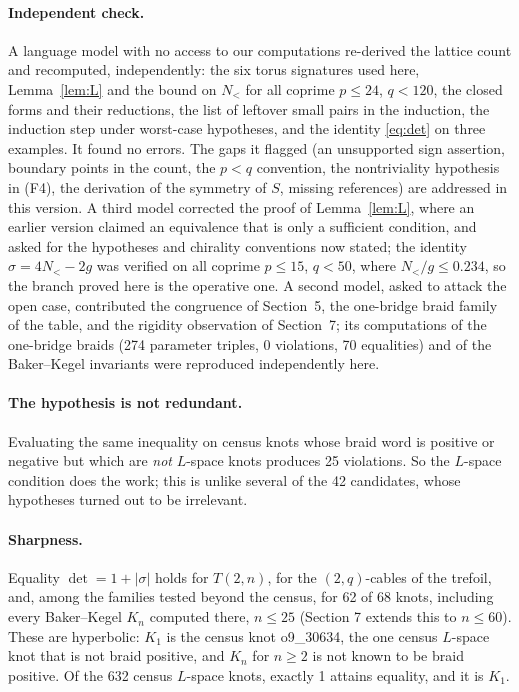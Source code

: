 \documentclass[11pt]{article}
\theoremstyle{definition}
\begin{document}
\paragraph{Independent check.} A language model with no access to our computations re-derived the lattice count and
recomputed, independently: the six torus signatures used here, Lemma~\ref{lem:L} and the bound on $N_<$ for all coprime
$p \le 24$, $q < 120$, the closed forms and their reductions, the list of leftover small pairs in the induction, the
induction step under worst-case hypotheses, and the identity \eqref{eq:det} on three examples. It found no errors. The
gaps it flagged (an unsupported sign assertion, boundary points in the count, the $p<q$ convention, the nontriviality
hypothesis in (F4), the derivation of the symmetry of $S$, missing references) are addressed in this version. A third model corrected the proof of Lemma~\ref{lem:L}, where an earlier version claimed an
equivalence that is only a sufficient condition, and asked for the hypotheses and chirality conventions now stated;
the identity $\sigma = 4N_{<} - 2g$ was verified on all coprime $p \le 15$, $q < 50$, where $N_{<}/g \le 0.234$, so
the branch proved here is the operative one. A second
model, asked to attack the open case, contributed the congruence of Section~5, the one-bridge braid family of the
table, and the rigidity observation of Section~7; its computations of the one-bridge braids (274 parameter triples, 0 violations,
70 equalities) and of the Baker--Kegel invariants were reproduced independently here.

\paragraph{The hypothesis is not redundant.} Evaluating the same inequality on census knots whose braid word is
positive or negative but which are \emph{not} $L$-space knots produces 25 violations. So the $L$-space condition does
the work; this is unlike several of the 42 candidates, whose hypotheses turned out to be irrelevant.

\paragraph{Sharpness.} Equality $\det = 1 + |\sigma|$ holds for $T(2,n)$, for the $(2,q)$-cables of the trefoil, and,
among the families tested beyond the census, for 62 of 68 knots, including every Baker--Kegel $K_n$ computed there,
$n \le 25$ (Section 7 extends this to $n \le 60$). These are hyperbolic: $K_1$ is the census knot o9\_30634, the one census $L$-space knot that is
not braid positive, and $K_n$ for $n \ge 2$ is not known to be braid positive. Of the 632 census $L$-space knots,
exactly 1 attains equality, and it is $K_1$.
\end{document}
